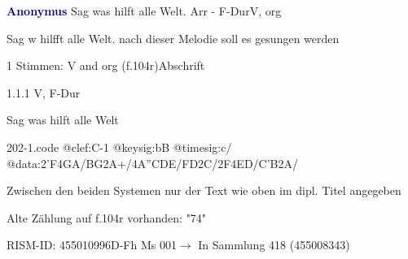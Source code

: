 \documentclass[twocolumn, 12pt]{book}
\begin{document}
\par \vspace{16pt} \textcolor{darkblue}{\textbf{Anonymus  }}\hfillplus{\textbf{[202]}}\newline Sag was hilft alle Welt. Arr - F-Dur\newline V, org
\par \begin{itshape} Sag w hilfft alle Welt. nach dieser Melodie soll es gesungen werden\end{itshape} 
\par \textcolor{darkblue}{}  1 Stimmen: V and org  (f.104r)\newline Abschrift
\par 1.1.1  V, F-Dur\newline \begin{footnotesize} Sag was hilft alle Welt \end{footnotesize}  
\begin{filecontents*}{202-1.code}
@clef:C-1
@keysig:bB
@timesig:c/
@data:2'F4GA/BG2A+/4A''CDE/FD2C/2F4ED/C'B2A/
\end{filecontents*}
\newline %
\par Zwischen den beiden Systemen nur der Text wie oben im dipl. Titel angegeben
\par Alte Zählung auf f.104r vorhanden: "74"
\par RISM-ID: 455010996\newline D-Fh  Ms 001\newline $\rightarrow$ In Sammlung 418 (455008343)
      
\end{document}
